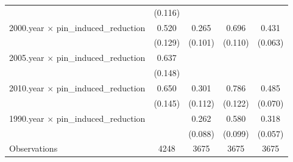 \begin{table}[htbp]
\begin{tabular}{l*{4}{c}}
                    &     (0.116)         &                     &                     &                     \\
2000.year $\times$ pin\_induced\_reduction&       0.520\sym{***}&       0.265\sym{***}&       0.696\sym{***}&       0.431\sym{***}\\
                    &     (0.129)         &     (0.101)         &     (0.110)         &     (0.063)         \\
2005.year $\times$ pin\_induced\_reduction&       0.637\sym{***}&                     &                     &                     \\
                    &     (0.148)         &                     &                     &                     \\
2010.year $\times$ pin\_induced\_reduction&       0.650\sym{***}&       0.301\sym{***}&       0.786\sym{***}&       0.485\sym{***}\\
                    &     (0.145)         &     (0.112)         &     (0.122)         &     (0.070)         \\
1990.year $\times$ pin\_induced\_reduction&                     &       0.262\sym{***}&       0.580\sym{***}&       0.318\sym{***}\\
                    &                     &     (0.088)         &     (0.099)         &     (0.057)         \\
\hline
Observations        &        4248         &        3675         &        3675         &        3675         \\
\hline\hline
\end{tabular}
\end{table}
